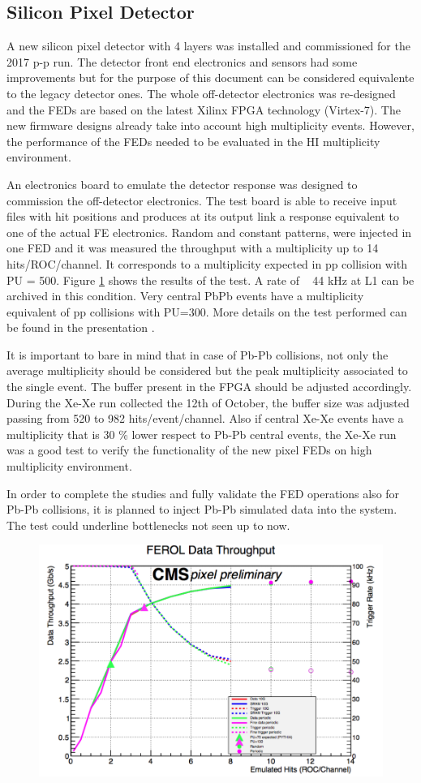 \subsection{Silicon Pixel Detector\label{subsec:SiPixel}} 
A new silicon pixel detector with 4 layers was installed and commissioned for the 2017 p-p run. The detector front end electronics and sensors had some improvements but for the purpose of this document can be considered equivalente to the legacy detector ones.
The whole off-detector electronics was re-designed and the FEDs are based on the
latest Xilinx FPGA technology (Virtex-7). The new firmware designs already take into account high multiplicity events. However, the performance of the FEDs needed to be evaluated in the HI multiplicity environment.

An electronics board to emulate the detector response was designed to commission the off-detector electronics. The test
board is able to receive input files with hit positions and produces at its output link a response equivalent to one of the actual FE electronics. Random and constant patterns, were injected in one FED and it was measured the throughput with a multiplicity up to 14 hits/ROC/channel. It corresponds to a multiplicity expected in pp collision with PU = 500. Figure \ref{fig:pixelFED} shows the results of the test. A rate of ~ 44 kHz at L1 can be archived in this condition. Very central PbPb events have a multiplicity equivalent of pp collisions with PU=300. More details on the test performed can be found in the presentation \cite{pixelFEROLThroughput}.

It is important to bare in mind that in case of Pb-Pb collisions, not only the average multiplicity should be considered but the peak multiplicity associated to the single event. The buffer present in the FPGA should be adjusted accordingly. During the Xe-Xe run collected the 12th of October, the buffer size was adjusted passing from 520 to 982 hits/event/channel. Also if central Xe-Xe events have a multiplicity that is 30 \% lower respect to Pb-Pb central events, the Xe-Xe run was a good test to verify the functionality of the new pixel FEDs on high multiplicity environment. 

In order to complete the studies and fully validate the FED operations also for Pb-Pb collisions, it is planned to inject Pb-Pb simulated data into the system. The test could underline bottlenecks not seen up to now. 


\begin{figure}[htbp]
\begin{center}
\includegraphics[width=.60\textwidth]{figures/PixelFEROLDataThroughput.png}
\caption{}
\label{fig:pixelFED}
\end{center}
\end{figure}

 

 
